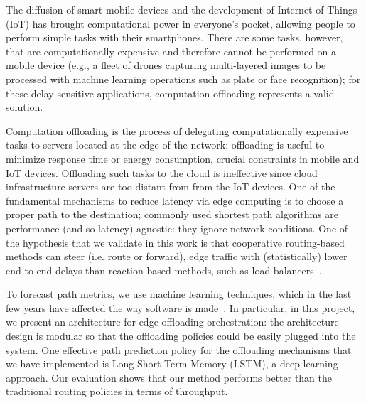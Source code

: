 \begin{summary}
The diffusion of smart mobile devices and the development of Internet of Things (IoT) has brought computational power in everyone's pocket, allowing people to perform simple tasks with their smartphones. There are some tasks, however, that are computationally  expensive and therefore cannot be performed on a mobile device (e.g., a fleet of drones capturing multi-layered images to be processed with machine learning operations such as plate or face recognition); for these delay-sensitive applications, computation offloading represents a valid solution.

Computation offloading is the process of delegating computationally expensive tasks to servers located at the edge of the network; offloading is useful to minimize response time or energy consumption, crucial constraints in mobile and IoT devices. Offloading such tasks to the cloud is ineffective since cloud infrastructure servers are too distant from from the IoT devices. %
One of the fundamental mechanisms to reduce latency via edge computing is to choose a proper path to the destination; commonly used shortest path algorithms are performance (and so latency) agnostic: they ignore network conditions. One of the hypothesis that we validate in this work is that cooperative routing-based methods can steer (i.e. route or forward), edge traffic with (statistically) lower end-to-end delays than reaction-based methods, such as load balancers~\cite{facebook_LB}.

To forecast path metrics, we use machine learning techniques, which in the last few years have affected the way software is made~\cite{karpathy}. 
In particular, in this project, we present an architecture for edge offloading orchestration: the architecture design is modular  so that the offloading policies could be easily plugged into the system. One effective path prediction policy for the offloading mechanisms that we have implemented is Long Short Term Memory (LSTM), a deep learning approach. Our evaluation shows that our method performs better than the traditional routing policies in terms of throughput.

\end{summary}